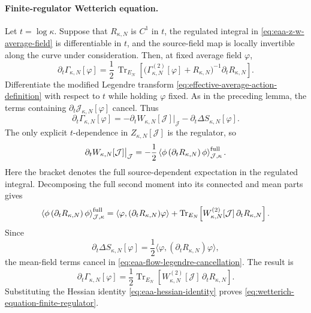 \paragraph{Finite-regulator Wetterich equation.}
Let \(t=\log\kappa\).  Suppose that \(R_{\kappa,N}\) is \(C^1\) in \(t\), the
regulated integral in \eqref{eq:eaa-z-w-average-field} is differentiable in
\(t\), and the source-field map is locally invertible along the curve under
consideration.  Then, at fixed average field \(\varphi\),
\begin{equation}
  \partial_t\Gamma_{\kappa,N}[\varphi]
  =
  \frac12\,\operatorname{Tr}_{E_N}
  \left[
    \bigl(\Gamma_{\kappa,N}^{(2)}[\varphi]+R_{\kappa,N}\bigr)^{-1}
    \partial_t R_{\kappa,N}
  \right].
  \label{eq:wetterich-equation-finite-regulator}
\end{equation}
Differentiate the modified Legendre transform
\eqref{eq:effective-average-action-definition} with respect to \(t\) while
holding \(\varphi\) fixed.  As in the preceding lemma, the terms containing
\(\partial_t\mathcal J_{\kappa,N}[\varphi]\) cancel.  Thus
\begin{equation}
  \partial_t\Gamma_{\kappa,N}[\varphi]
  =
  -\partial_t W_{\kappa,N}[\mathcal J]\big|_{\mathcal J}
  -\partial_t\Delta S_{\kappa,N}[\varphi].
  \label{eq:eaa-flow-legendre-cancellation}
\end{equation}
The only explicit \(t\)-dependence in
\(Z_{\kappa,N}[\mathcal J]\) is the regulator, so
\[
  \partial_t W_{\kappa,N}[\mathcal J]\big|_{\mathcal J}
  =
  -\frac12
  \left\langle
    \phi\,(\partial_t R_{\kappa,N})\,\phi
  \right\rangle_{\mathcal J,\kappa}^{\rm full}.
\]
Here the bracket denotes the full source-dependent expectation in the
regulated integral.  Decomposing the full second moment into its connected and
mean parts gives
\[
  \left\langle
    \phi\,(\partial_t R_{\kappa,N})\,\phi
  \right\rangle_{\mathcal J,\kappa}^{\rm full}
  =
  \langle\varphi,(\partial_tR_{\kappa,N})\varphi\rangle
  +
  \operatorname{Tr}_{E_N}\!
  \left[
    W_{\kappa,N}^{(2)}[\mathcal J]\,\partial_tR_{\kappa,N}
  \right].
\]
Since
\[
  \partial_t\Delta S_{\kappa,N}[\varphi]
  =
  \frac12
  \langle\varphi,(\partial_tR_{\kappa,N})\varphi\rangle,
\]
the mean-field terms cancel in
\eqref{eq:eaa-flow-legendre-cancellation}.  The result is
\[
  \partial_t\Gamma_{\kappa,N}[\varphi]
  =
  \frac12\operatorname{Tr}_{E_N}
  \left[
    W_{\kappa,N}^{(2)}[\mathcal J]\,\partial_tR_{\kappa,N}
  \right].
\]
Substituting the Hessian identity
\eqref{eq:eaa-hessian-identity} proves
\eqref{eq:wetterich-equation-finite-regulator}.

